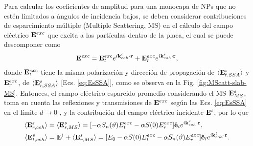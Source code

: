 Para calcular los coeficientes de amplitud para una monocapa de NPs que no estén limitados a ángulos de incidencia bajos, se deben considerar contribuciones de esparcimiento múltiple (Multiple Scattering, MS) en el cálculo del campo eléctrico $\vb{E}^{exc}$  que excita a las partículas dentro de la placa, el cual se puede descomponer como 
	\begin{align}
	\vb{E}^{exc} = \vb{E}^{exc}_{t} e^{i\vb{k}^t_{coh}\cdot\vb{r}}+
					\vb{E}^{exc}_{r} e^{i\vb{k}^r_{coh}\cdot\vb{r}},
	\end{align}
donde  $\vb{E}^{exc}_t$ tiene la misma polarización y dirección de propagación de $\langle \vb{E}^s_{t,SSA}\rangle$  y $\vb{E}^{exc}_{r}$, de $\langle \vb{E}^s_{r,SSA}\rangle$ [Ecs. \eqref{eq:EsSSA}], como se observa en la Fig. \ref{fig:MScatt-slab-MS}. Entonces, el campo eléctrico esparcido promedio considerando el MS $\vb{E}^s_{MS}$, toma en cuenta  las reflexiones y transmisiones de $\vb{E}^{exc}$ según las Ecs. \eqref{eq:EsSSA} en el límite $d\to 0$ \cite{gutierrez2012overview}, y la contribución del campo eléctrico incidente $\vb{E}^i$, por lo que  \cite{reyes2018analytical}
	\begin{subequations}\begin{align}
		\langle \vb{E}^s_{r,coh}\rangle & =	\langle \vb{E}^s_{r,MS}\rangle
					= \qty[-\alpha S_n(\vartheta)E^{exc}_t -\alpha S(0)E^{exc}_r
					]\vu{e}_i e^{i\vb{k}^r_{coh}\cdot\vb{r}},\\
		\langle \vb{E}^s_{t,coh}\rangle & =\vb{E}^i+\langle\vb{E}^s_{r,MS}\rangle
					= \qty[E_0 -\alpha S(0)E^{exc}_t 
					-\alpha	 S_n(\vartheta)E^{exc}_r
					]\vu{e}_i e^{i\vb{k}^t_{coh}\cdot\vb{r}}.
	\end{align} \label{eq:EsMS}\end{subequations} \vspace*{-2em}

